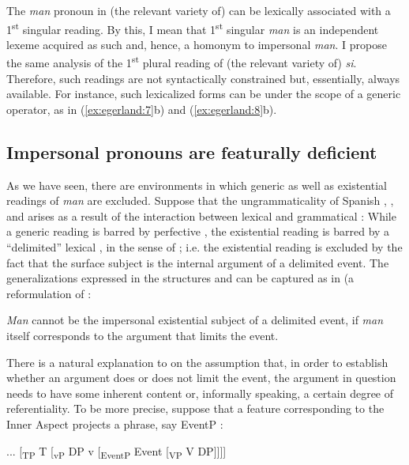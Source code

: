 \documentclass[output=paper]{LSP/langsci}
\begin{document}
The \textit{man} pronoun in (the relevant variety of)  can be lexically associated with a 1\textsuperscript{st} singular reading. By this, I mean that 1\textsuperscript{st} singular \textit{man} is an independent lexeme acquired as such and, hence, a homonym to impersonal \textit{man}. I propose the same analysis of the 1\textsuperscript{st} plural reading of (the relevant variety of)  \textit{si}. Therefore, such readings are not syntactically constrained but, essentially, always available. For instance, such lexicalized forms can be under the scope of a generic operator, as in (\ref{ex:egerland:7}b) and (\ref{ex:egerland:8}b).
%

\subsection{Impersonal pronouns are featurally deficient}\label{sec:egerland:3.2}

As we have seen, there are environments in which generic as well as existential readings of \textit{man} are excluded. Suppose that the ungrammaticality of Spanish ,  , and   arises as a result of the interaction between lexical and grammatical : While a generic reading is barred by perfective , the existential reading is barred by a “delimited” lexical , in the sense of \citet{Tenny1987}; i.e. the existential reading is excluded by the fact that the surface subject is the internal argument of a delimited event. The generalizations expressed in the structures  and  can be captured as in  (a reformulation of \citet[82]{Egerland2003swedish}:

\ea\label{ex:egerland:21}
\textit{Man} cannot be the impersonal existential subject of a delimited event, if \textit{man} itself corresponds to the argument that limits the event.
\z

There is a natural explanation to  on the assumption that, in order to establish whether an argument does or does not limit the event, the argument in question needs to have some inherent content or, informally speaking, a certain degree of referentiality. To be more precise, suppose that a feature corresponding to the Inner Aspect projects a phrase, say EventP \citep{Travis2000,Borer2005}:

\ea\label{ex:egerland:22}
... [\textsubscript{TP} T [\textsubscript{vP} DP v [\textsubscript{EventP} Event [\textsubscript{VP} V DP]]]]
\z
\end{document}
